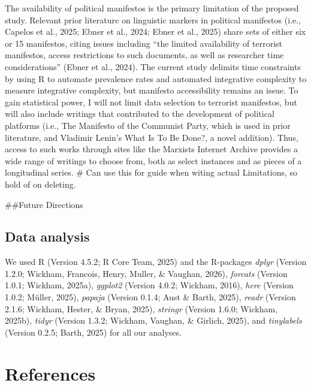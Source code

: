 \documentclass[
  english,
  man]{apa6}
\begin{document}
The availability of political manifestos is the primary limitation of the proposed study.
Relevant prior literature on linguistic markers in political manifestos (i.e., Capelos et
al., 2025; Ebner et al., 2024; Ebner et al., 2025) share sets of either six or 15
manifestos, citing issues including ``the limited availability of terrorist manifestos,
access restrictions to such documents, as well as researcher time considerations'' (Ebner et
al., 2024). The current study delimits time constraints by using R to automate prevalence
rates and automated integrative complexity to measure integrative complexity, but manifesto
accessibility remains an issue. To gain statistical power, I will not limit data selection
to terrorist manifestos, but will also include writings that contributed to the development
of political platforms (i.e., The Manifesto of the Communist Party, which is used in prior
literature, and Vladimir Lenin's What Is To Be Done?, a novel addition). Thus, access to
such works through sites like the Marxists Internet Archive provides a wide range of
writings to choose from, both as select instances and as pieces of a longitudinal series.
\#\textbar{} Can use this for guide when witing actual Limitations, so hold of on deleting.

\#\#Future Directions

\subsection{Data analysis}\label{data-analysis}

We used R (Version 4.5.2; R Core Team, 2025) and the R-packages \emph{dplyr} (Version 1.2.0; Wickham, Francois, Henry, Muller, \& Vaughan, 2026), \emph{forcats} (Version 1.0.1; Wickham, 2025a), \emph{ggplot2} (Version 4.0.2; Wickham, 2016), \emph{here} (Version 1.0.2; Müller, 2025), \emph{papaja} (Version 0.1.4; Aust \& Barth, 2025), \emph{readr} (Version 2.1.6; Wickham, Hester, \& Bryan, 2025), \emph{stringr} (Version 1.6.0; Wickham, 2025b), \emph{tidyr} (Version 1.3.2; Wickham, Vaughan, \& Girlich, 2025), and \emph{tinylabels} (Version 0.2.5; Barth, 2025) for all our analyses.

\newpage

\section{References}\label{references}
\end{document}
